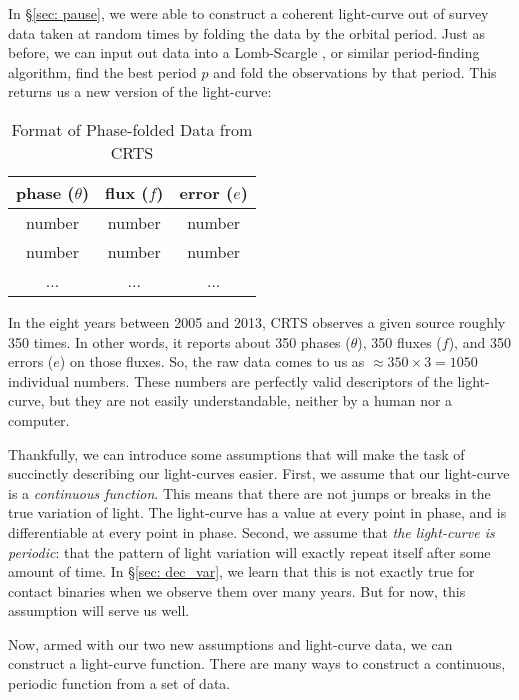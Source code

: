 \documentclass[12pt]{article} %
\numberwithin{equation}{section} %
\begin{document}
In \S\ref{sec: pause}, we were able to construct a coherent light-curve out of survey data taken at random times by folding the data by the orbital period. Just as before, we can input out data into a Lomb-Scargle , or similar period-finding algorithm, find the best period $p$ and fold the observations by that period. This returns us a new version of the light-curve:

\begin{table}[htdp]
\caption{Format of Phase-folded Data from CRTS}
\begin{center}
\begin{tabular}{|c|c|c|} \hline
\textbf{phase} ($\theta$) & \textbf{flux} ($f$) & \textbf{error} ($e$) \\ \hline
number & number & number \\ \hline
number & number & number \\ \hline
... & ... & ... \\
\end{tabular}
\end{center}
\label{default}
\end{table}%

In the eight years between 2005 and 2013, CRTS observes a given source roughly 350 times. In other words, it reports about 350 phases ($\theta$), 350 fluxes ($f$), and 350 errors ($e$) on those fluxes. So, the raw data comes to us as $\approx 350 \times 3 = 1050$ individual numbers. These numbers are perfectly valid descriptors of the light-curve, but they are not easily understandable, neither by a human nor a computer.

Thankfully, we can introduce some assumptions that will make the task of succinctly describing our light-curves easier. First, we assume that our light-curve is a \emph{continuous function}. This means that there are not jumps or breaks in the true variation of light. The light-curve has a value at every point in phase, and is differentiable at every point in phase. Second, we assume that \emph{the light-curve is periodic}: that the pattern of light variation will exactly repeat itself after some amount of time. In \S\ref{sec: dec_var}, we learn that this is not exactly true for contact binaries when we observe them over many years. But for now, this assumption will serve us well.

Now, armed with our two new assumptions and light-curve data, we can construct a light-curve function. There are many ways to construct a continuous, periodic function from a set of data. \\
\end{document}

